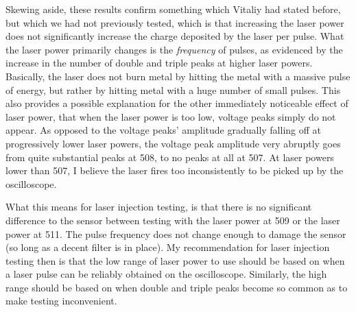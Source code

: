\documentclass{report}
\begin{document}
            Skewing aside, these results confirm something which Vitaliy had stated before, but which we had not previously tested, which is that increasing the laser power does not significantly increase the charge deposited by the laser per pulse. What the laser power primarily changes is the \textit{frequency} of pulses, as evidenced by the increase in the number of double and triple peaks at higher laser powers. Basically, the laser does not burn metal by hitting the metal with a massive pulse of energy, but rather by hitting metal with a huge number of small pulses. This also provides a possible explanation for the other immediately noticeable effect of laser power, that when the laser power is too low, voltage peaks simply do not appear. As opposed to the voltage peaks' amplitude gradually falling off at progressively lower laser powers, the voltage peak amplitude very abruptly goes from quite substantial peaks at 508, to no peaks at all at 507. At laser powers lower than 507, I believe the laser fires too inconsistently to be picked up by the oscilloscope.
            
            What this means for laser injection testing, is that there is no significant difference to the sensor between testing with the laser power at 509 or the laser power at 511. The pulse frequency does not change enough to damage the sensor (so long as a decent filter is in place). My recommendation for laser injection testing then is that the low range of laser power to use should be based on when a laser pulse can be reliably obtained on the oscilloscope. Similarly, the high range should be based on when double and triple peaks become so common as to make testing inconvenient.

            
            


        
    
\end{document}
